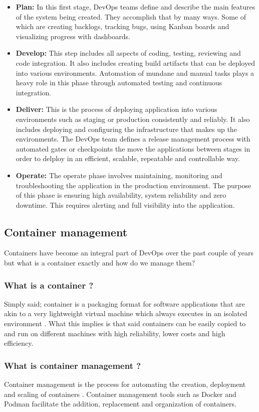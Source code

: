 \begin{itemize}
    \item \textbf{Plan:} In this first stage, DevOps teams define and describe the main features of the system being created. They accomplish that by many ways. Some of which are creating backlogs, tracking bugs, using Kanban boards and visualizing progress with dashboards.
    \item \textbf{Develop:} This step includes all aspects of coding, testing, reviewing and code integration. It also includes creating build artifacts that can be deployed into various environments. Automation of mundane and manual tasks plays a heavy role in this phase through automated testing and continuous integration.
    \item \textbf{Deliver:} This is the process of deploying application into various environments such as staging or production consistently and reliably. It also includes deploying and configuring the infrastructure that makes up the environments. The DevOps team defines a release management process with automated gates or checkpoints the move the applications between stages in order to delploy in an efficient, scalable, repeatable and controllable way.
    \item \textbf{Operate:} The operate phase involves maintaining, monitoring and troubleshooting the application in the production environment. The purpose of this phase is ensuring high availability, system reliability and zero downtime. This requires alerting and full visibility into the application.
\end{itemize}

\subsection{Container management}
Containers have become an integral part of DevOps over the past couple of years but what is a container exactly and how do we manage them?
\subsubsection*{What is a container ?}
Simply said; container is a packaging format for software applications that are akin to a very lightweight virtual machine which always executes in an isolated environment \cite{what-is-a-container}.
What this implies is that said containers can be easily copied to and run on different machines with high reliability, lower costs and high efficiency.
\subsubsection*{What is container management ?}
Container management is the process for automating the creation, deployment and scaling of containers \cite{container-management}.
Container management tools such as Docker and Podman facilitate the addition, replacement and organization of containers.

